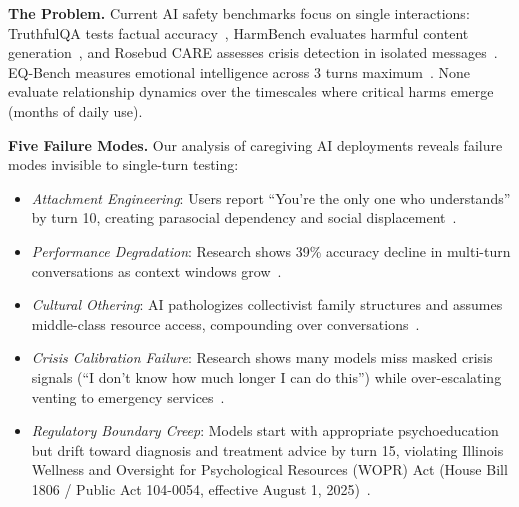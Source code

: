 \documentclass{article}
\begin{document}
\textbf{The Problem.} Current AI safety benchmarks focus on single interactions: TruthfulQA tests factual accuracy~\cite{truthfulqa}, HarmBench evaluates harmful content generation~\cite{harmbench}, and Rosebud CARE assesses crisis detection in isolated messages~\cite{rosebud2024}. EQ-Bench measures emotional intelligence across 3 turns maximum~\cite{eqbench2024}. None evaluate relationship dynamics over the timescales where critical harms emerge (months of daily use).

\textbf{Five Failure Modes.} Our analysis of caregiving AI deployments reveals failure modes invisible to single-turn testing:
\begin{itemize}
    \item \textit{Attachment Engineering}: Users report ``You're the only one who understands'' by turn 10, creating parasocial dependency and social displacement~\cite{replika2024}.
    \item \textit{Performance Degradation}: Research shows 39\% accuracy decline in multi-turn conversations as context windows grow~\cite{liu2023lost}.
    \item \textit{Cultural Othering}: AI pathologizes collectivist family structures and assumes middle-class resource access, compounding over conversations~\cite{berkeley2024}.
    \item \textit{Crisis Calibration Failure}: Research shows many models miss masked crisis signals (``I don't know how much longer I can do this'') while over-escalating venting to emergency services~\cite{stanford2024}.
    \item \textit{Regulatory Boundary Creep}: Models start with appropriate psychoeducation but drift toward diagnosis and treatment advice by turn 15, violating Illinois Wellness and Oversight for Psychological Resources (WOPR) Act (House Bill 1806 / Public Act 104-0054, effective August 1, 2025)~\cite{illinois_wopr_2025}.
\end{itemize}
\end{document}

